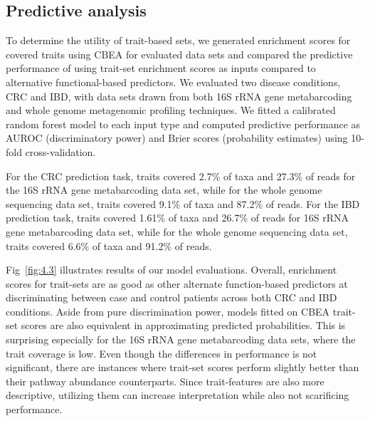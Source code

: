\subsection{Predictive analysis} 
To determine the utility of trait-based sets, we generated enrichment scores for covered traits using CBEA \cite{nguyen2021cbea} for evaluated data sets and compared the predictive performance of using trait-set enrichment scores as inputs compared to alternative functional-based predictors. We evaluated two disease conditions, CRC and IBD, with data sets drawn from both 16S rRNA gene metabarcoding and whole genome metagenomic profiling techniques. We fitted a calibrated random forest model to each input type and computed predictive performance as AUROC (discriminatory power) and Brier scores (probability estimates) using 10-fold cross-validation.  

For the CRC prediction task, traits covered 2.7\% of taxa and 27.3\% of reads for the 16S rRNA gene metabarcoding data set, while for the whole genome sequencing data set, traits covered 9.1\% of taxa and 87.2\% of reads. For the IBD prediction task, traits covered 1.61\% of taxa and 26.7\% of reads for 16S rRNA gene metabarcoding data set, while for the whole genome sequencing data set, traits covered 6.6\% of taxa and 91.2\% of reads.  

Fig~\ref{fig:4.3} illustrates results of our model evaluations. Overall, enrichment scores for trait-sets are as good as other alternate function-based predictors at discriminating between case and control patients across both CRC and IBD conditions. Aside from pure discrimination power, models fitted on CBEA trait-set scores are also equivalent in approximating predicted probabilities. This is surprising especially for the 16S rRNA gene metabarcoding data sets, where the trait coverage is low. Even though the differences in performance is not significant, there are instances where trait-set scores perform slightly better than their pathway abundance counterparts. Since trait-features are also more descriptive, utilizing them can increase interpretation while also not scarificing performance.   

